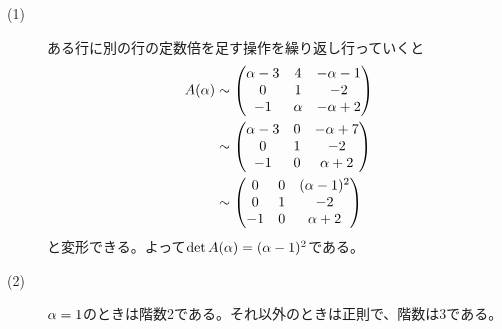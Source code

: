 \begin{sol} ${}$
\begin{description}
  \item[(1)] ある行に別の行の定数倍を足す操作を繰り返し行っていくと
  \begin{align*}
    A({\alpha}) &\sim \begin{pmatrix}  {\alpha} -3 & 4 & - {\alpha} -1 \\ 0 & 1  & -2 \\ -1 & {\alpha} & - {\alpha} +2 \end{pmatrix} \\
    &\sim \begin{pmatrix}  {\alpha} -3 & 0 & - {\alpha} +7 \\ 0 & 1  & -2 \\ -1 & 0 & {\alpha} +2 \end{pmatrix} \\
    &\sim \begin{pmatrix}  0 & 0 & ({\alpha} - 1)^2 \\ 0 & 1  & -2 \\ -1 & 0 & {\alpha} +2 \end{pmatrix} \\
  \end{align*}
  と変形できる。よって$\det A({\alpha}) = ({\alpha} - 1)^2$である。
  \item[(2)] ${\alpha}=1$のときは階数2である。それ以外のときは正則で、階数は3である。
\end{description}

\end{sol}


\newpage



